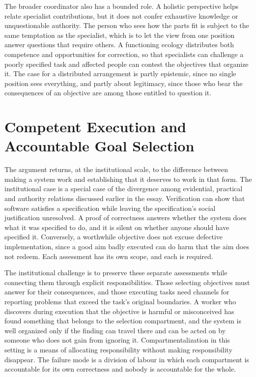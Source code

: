 \documentclass[12pt, a4paper]{article}
\begin{document}
The broader coordinator also has a bounded role. A holistic perspective helps relate specialist contributions, but it does not confer exhaustive knowledge or unquestionable authority. The person who sees how the parts fit is subject to the same temptation as the specialist, which is to let the view from one position answer questions that require others. A functioning ecology distributes both competence and opportunities for correction, so that specialists can challenge a poorly specified task and affected people can contest the objectives that organize it. The case for a distributed arrangement is partly epistemic, since no single position sees everything, and partly about legitimacy, since those who bear the consequences of an objective are among those entitled to question it.

\section{Competent Execution and Accountable Goal Selection}

The argument returns, at the institutional scale, to the difference between making a system work and establishing that it deserves to work in that form. The institutional case is a special case of the divergence among evidential, practical and authority relations discussed earlier in the essay. Verification can show that software satisfies a specification while leaving the specification's social justification unresolved. A proof of correctness answers whether the system does what it was specified to do, and it is silent on whether anyone should have specified it. Conversely, a worthwhile objective does not excuse defective implementation, since a good aim badly executed can do harm that the aim does not redeem. Each assessment has its own scope, and each is required.

The institutional challenge is to preserve these separate assessments while connecting them through explicit responsibilities. Those selecting objectives must answer for their consequences, and those executing tasks need channels for reporting problems that exceed the task's original boundaries. A worker who discovers during execution that the objective is harmful or misconceived has found something that belongs to the selection compartment, and the system is well organized only if the finding can travel there and can be acted on by someone who does not gain from ignoring it. Compartmentalization in this setting is a means of allocating responsibility without making responsibility disappear. The failure mode is a division of labour in which each compartment is accountable for its own correctness and nobody is accountable for the whole.
\end{document}
